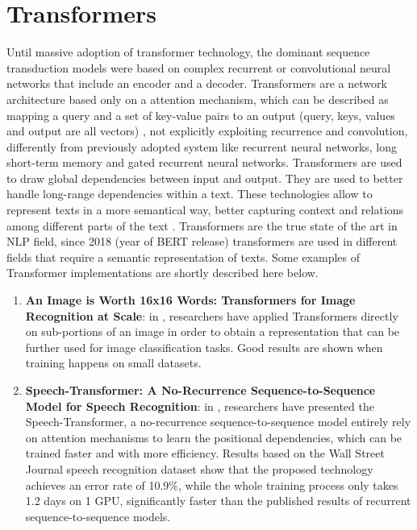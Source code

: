 \documentclass[\main/main.tex]{subfiles}
\begin{document}
\section{Transformers}
Until massive adoption of transformer technology, the dominant sequence transduction models were based on complex recurrent or convolutional neural networks that include an encoder and a decoder.
Transformers are a network architecture based only on a attention mechanism, which can be described as mapping a query and a set of key-value pairs to an output (query, keys, values and output are all vectors) \cite{vaswani2017attention}, not explicitly exploiting recurrence and convolution, differently from previously adopted system like recurrent neural networks, long short-term memory and gated recurrent neural networks. Transformers are used to draw global dependencies between input and output. They are used to better handle long-range dependencies within a text. These technologies allow to represent texts in a more semantical way, better capturing context and relations among different parts of the text \cite{vaswani2017attention}. Transformers are the true state of the art in NLP field, since 2018 (year of BERT \cite{devlin2018bert}\cite{bert_blog_post} release) transformers are used in different fields that require a semantic representation of texts. Some examples of Transformer implementations are shortly described here below.
\begin{enumerate}
    \item \textbf{An Image is Worth 16x16 Words: Transformers for Image Recognition at Scale}: in \cite{Dosovitskiy2021AnII}, researchers have applied Transformers directly on sub-portions of an image in order to obtain a representation that can be further used for image classification tasks. Good results are shown when training happens on small datasets.
    \item \textbf{Speech-Transformer: A No-Recurrence Sequence-to-Sequence \\Model for Speech Recognition}: in \cite{Dong2018SpeechTransformerAN}, researchers have presented the Speech-Transformer, a no-recurrence sequence-to-sequence model entirely rely on attention mechanisms to learn the positional dependencies, which can be trained faster and with more efficiency. Results based on the Wall Street Journal speech recognition dataset show that the proposed technology achieves an error rate of 10.9\%, while the whole training process only takes 1.2 days on 1 GPU, significantly faster than the published results of recurrent sequence-to-sequence models. 
\end{enumerate}
\end{document}
